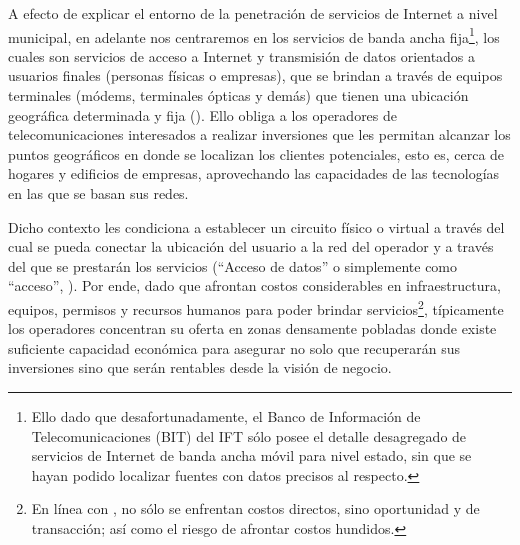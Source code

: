 \documentclass[9pt,twocolumn,twoside]{ilcss}
\begin{document}
A efecto de explicar el entorno de la penetración de servicios de Internet a nivel municipal, en adelante nos centraremos en los servicios de banda ancha fija\footnote{Ello dado que desafortunadamente, el Banco de Información de Telecomunicaciones (BIT) del IFT sólo posee el detalle desagregado de servicios de Internet de banda ancha móvil para nivel estado, sin que se hayan podido localizar fuentes con datos precisos al respecto.}, los cuales son servicios de acceso a Internet y transmisión de datos orientados a usuarios finales (personas físicas o empresas), que se brindan a través de equipos terminales (módems, terminales ópticas y demás) que tienen una ubicación geográfica determinada y fija (\cite{IFT2018man}). Ello obliga a los operadores de telecomunicaciones interesados a realizar inversiones que les permitan alcanzar los puntos geográficos en donde se localizan los clientes potenciales, esto es, cerca de hogares y edificios de empresas, aprovechando las capacidades de las tecnologías en las que se basan sus redes. 

Dicho contexto les condiciona a establecer un circuito físico o virtual a través del cual se pueda conectar la ubicación del usuario a la red del operador y a través del que se prestarán los servicios (“Acceso de datos” o simplemente como “acceso”, \cite{IFT2018man}). Por ende, dado que afrontan costos considerables en infraestructura, equipos, permisos y recursos humanos para poder brindar servicios\footnote{En línea con \cite{IFT2017reb}, no sólo se enfrentan costos directos, sino oportunidad y de transacción; así como el riesgo de afrontar costos hundidos.}, típicamente los operadores concentran su oferta en zonas densamente pobladas donde existe suficiente capacidad económica para asegurar no solo que recuperarán sus inversiones sino que serán rentables desde la visión de negocio.
\end{document}
